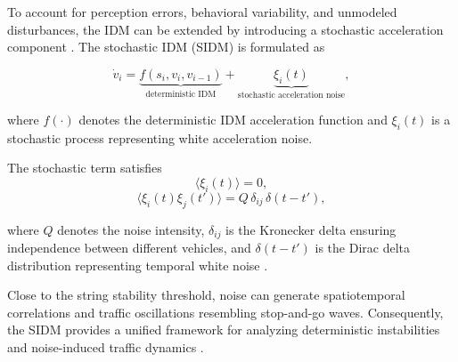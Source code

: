 To account for perception errors, behavioral variability, and unmodeled disturbances, the IDM can be extended by introducing a stochastic acceleration component \cite{Treiber.2018}. The stochastic IDM (SIDM) is formulated as

\begin{equation}
	\dot{v}_i =
	\underbrace{f(s_i, v_i, v_{i-1})}_{\text{deterministic IDM}}
	+
	\underbrace{\xi_i(t)}_{\text{stochastic acceleration noise}},
\end{equation}

where $f(\cdot)$ denotes the deterministic IDM acceleration function and $\xi_i(t)$ is a stochastic process representing white acceleration noise.

The stochastic term satisfies
\begin{equation}
	\langle \xi_i(t) \rangle = 0,
\end{equation}
\begin{equation}
	\langle \xi_i(t)\xi_j(t') \rangle
	=
	Q \, \delta_{ij} \, \delta(t - t'),
\end{equation}

where $Q$ denotes the noise intensity, $\delta_{ij}$ is the Kronecker delta ensuring independence between different vehicles, and $\delta(t-t')$ is the Dirac delta distribution representing temporal white noise \cite{Treiber.2018}.

 Close to the string stability threshold, noise can generate spatiotemporal correlations and traffic oscillations resembling stop-and-go waves. Consequently, the SIDM provides a unified framework for analyzing deterministic instabilities and noise-induced traffic dynamics \cite{Treiber.2018}.